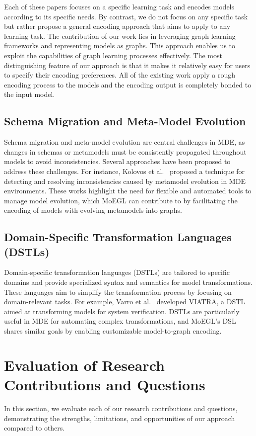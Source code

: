 \documentclass[journal,article,submit,moreauthors,technologies]{Definitions/mdpi}
\begin{document}
Each of these papers focuses on a specific learning task and encodes models according to its specific needs. By contrast, we do not focus on any specific task but rather propose a general encoding approach that aims to apply to any learning task.
The contribution of our work lies in leveraging graph learning frameworks and representing models as graphs. This approach enables us to exploit the capabilities of graph learning processes effectively. The most distinguishing feature of our approach is that it makes it relatively easy for users to specify their encoding preferences. All of the existing work apply a rough encoding process to the models and the encoding output is completely bonded to the input model.

\subsection{Schema Migration and Meta-Model Evolution}
Schema migration and meta-model evolution are central challenges in MDE, as changes in schemas or metamodels must be consistently propagated throughout models to avoid inconsistencies. Several approaches have been proposed to address these challenges. For instance, Kolovos et al.~\cite{kolovos2008detecting} proposed a technique for detecting and resolving inconsistencies caused by metamodel evolution in MDE environments. These works highlight the need for flexible and automated tools to manage model evolution, which MoEGL can contribute to by facilitating the encoding of models with evolving metamodels into graphs.

\subsection{Domain-Specific Transformation Languages (DSTLs)}
Domain-specific transformation languages (DSTLs) are tailored to specific domains and provide specialized syntax and semantics for model transformations. These languages aim to simplify the transformation process by focusing on domain-relevant tasks. For example, Varro et al.~\cite{csertan2002viatra} developed VIATRA, a DSTL aimed at transforming models for system verification. DSTLs are particularly useful in MDE for automating complex transformations, and MoEGL's DSL shares similar goals by enabling customizable model-to-graph encoding.


\section{Evaluation of Research Contributions and Questions}
In this section, we evaluate each of our research contributions and questions, demonstrating the strengths, limitations, and opportunities of our approach compared to others.
\end{document}
